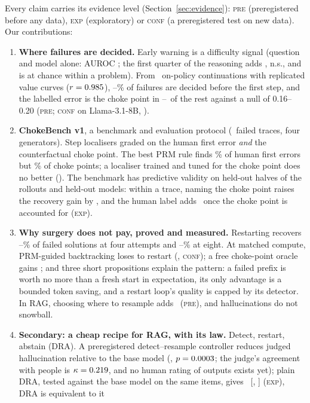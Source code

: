 \documentclass[10pt,twocolumn]{article}
\begin{document}
Every claim carries its evidence level (Section~\ref{sec:evidence}): \textsc{pre} (preregistered
before any data), \textsc{exp} (exploratory) or \textsc{conf} (a preregistered test on new data).
Our contributions:
\begin{enumerate}
\item \textbf{Where failures are decided.} Early warning is a difficulty signal (question and
model alone: AUROC \aucQG; the first quarter of the reasoning adds \dIncA, n.s., and is at chance
within a problem). From \TotalRollouts\ on-policy continuations with replicated value curves
($r=0.985$), \QwenSmallAllCapPct--\QwenMathCapPct\% of failures are decided before the
first step, and the labelled error is the choke point in \QwenTwoAllDec--\QwenSmallAllDec\ of the rest
against a null of 0.16--0.20 (\textsc{pre}; \textsc{conf} on Llama-3.1-8B, \LlamaDec).
\item \textbf{ChokeBench v1}, a benchmark and evaluation protocol (\cbN\ failed traces, four generators). Step localisers graded on the human first error \emph{and}
the counterfactual choke point. The best PRM rule finds \cbPrmDropAccHPct\% of human first errors but
\cbPrmDropAccDPct\% of choke points; a localiser trained and tuned for the choke point does no
better (\cbLearnedAccD). The benchmark has predictive validity on held-out halves of the rollouts
and held-out models: within a trace, naming the choke point raises the recovery gain by \valBothD,
and the human label adds \valBothE\ once the choke point is accounted for (\textsc{exp}).
\item \textbf{Why surgery does not pay, proved and measured.} Restarting recovers \recMinFour--\recMaxFour\% of failed
solutions at four attempts and \recMinEight--\recMaxEight\% at eight. At matched compute, PRM-guided
backtracking loses to restart (\LlamaPolPrmDropFourDiff, \textsc{conf}); a free choke-point oracle
gains \cbOracleGainB; and three short propositions explain the pattern: a failed prefix is worth no
more than a fresh start in expectation, its only advantage is a bounded token saving, and a
restart loop's quality is capped by its detector. In RAG, choosing where to resample adds
\rrHFive\ (\textsc{pre}), and hallucinations do not snowball.
\item \textbf{Secondary: a cheap recipe for RAG, with its law.} Detect, restart, abstain
(DRA). A preregistered detect--resample controller
reduces judged hallucination relative to the base model (\rrHZero, $p=0.0003$; the judge's agreement with people is $\kappa=0.219$, and no human rating of outputs exists yet); plain DRA, tested against the base model on the same items, gives \vbDraEOne\ [\vbDraEOneLo, \vbDraEOneHi] (\textsc{exp}), DRA is equivalent to it

\end{enumerate}
\end{document}
